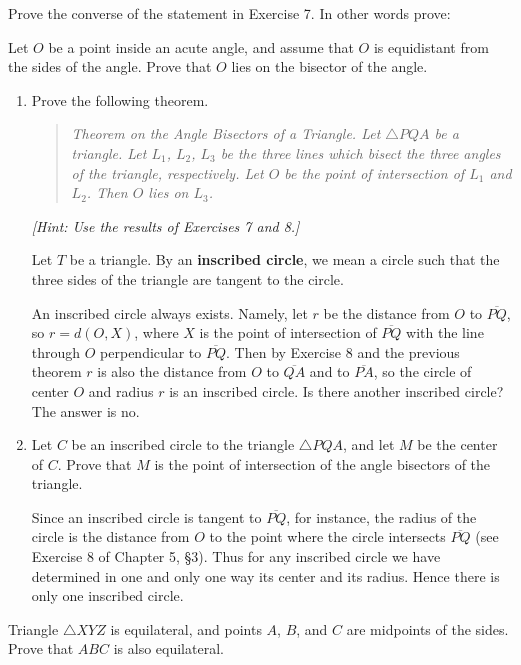 \documentclass[12pt]{book} %
\begin{document}
\begin{ExerciseList}
\Exercise Prove the converse of the statement in Exercise 7. In other words prove:

Let $O$ be a point inside an acute angle, and assume that $O$ is equidistant from the sides of the angle. Prove that $O$ lies on the bisector of the angle.

\Exercise
\begin{enumerate}
\item[(a)] Prove the following theorem.

\begin{quote}
\textit{Theorem on the Angle Bisectors of a Triangle. Let $\triangle PQA$ be a triangle. Let $L_1$, $L_2$, $L_3$ be the three lines which bisect the three angles of the triangle, respectively. Let $O$ be the point of intersection of $L_1$ and $L_2$. Then $O$ lies on $L_3$.}
\end{quote}

\textit{[Hint: Use the results of Exercises 7 and 8.]}

Let $T$ be a triangle. By an \textbf{inscribed circle}, we mean a circle such that the three sides of the triangle are tangent to the circle.


An inscribed circle always exists. Namely, let $r$ be the distance from $O$ to $\overline{PQ}$, so $r=d(O,X)$, where $X$ is the point of intersection of $\overline{PQ}$ with the line through $O$ perpendicular to $\overline{PQ}$. Then by Exercise 8 and the previous theorem $r$ is also the distance from $O$ to $\overline{QA}$ and to $\overline{PA}$, so the circle of center $O$ and radius $r$ is an inscribed circle. Is there another inscribed circle? The answer is no.

\item[(b)] Let $C$ be an inscribed circle to the triangle $\triangle PQA$, and let $M$ be the center of $C$. Prove that $M$ is the point of intersection of the angle bisec­tors of the triangle.

Since an inscribed circle is tangent to $\overline{PQ}$, for instance, the radius of the circle is the distance from $O$ to the point where the circle intersects $\overline{PQ}$ (see Exercise 8 of Chapter 5, \S3). Thus for any inscribed circle we have determined in one and only one way its center and its radius. Hence there is only one inscribed circle.
\end{enumerate}

\Exercise Triangle $\triangle XYZ$ is equilateral, and points $A$, $B$, and $C$ are midpoints of the sides. Prove that $ABC$ is also equilateral.


\end{ExerciseList}
\end{document}
